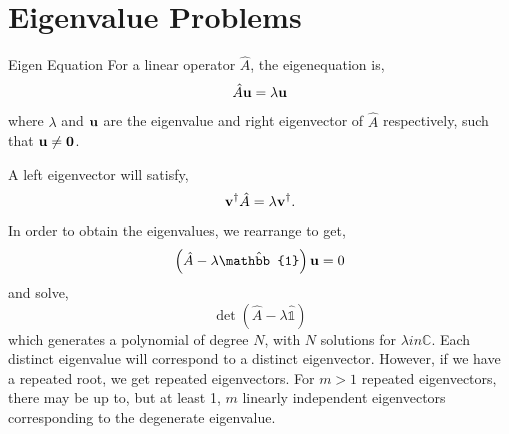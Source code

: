 \documentclass{book}
\begin{document}
\section{Eigenvalue Problems}
\begin{Definitions}{Eigen Equation}{}
	For a linear operator $\hat{A}$, the eigenequation is,
	\begin{equation}
		\hat{A}\vb{u}= \lambda \vb{u}
	\end{equation}
	where $\lambda$ and $\vb{u}$ are the eigenvalue and right eigenvector of $\hat{A}$ respectively, such that $\vb{u} \neq \vb{0}$.
\end{Definitions}
A left eigenvector will satisfy,
\begin{equation}
	\vb{v}^{\dag}\hat{A} = \lambda\vb{v}^{\dag}.
\end{equation}
In order to obtain the eigenvalues, we rearrange to get,
\begin{equation}
	\left(\hat{A} - \lambda \hat{\mathbb{1}}\right)\vb{u} = 0
\end{equation}
and solve,
\begin{equation}
	\det\left(\hat{A} - \lambda \hat{\mathbb{1}}\right)
\end{equation}
which generates a polynomial of degree $N$, with $N$ solutions for $\lambda in \mathbb{C}$. Each distinct eigenvalue will correspond to a distinct eigenvector. However, if we have a repeated root, we get repeated eigenvectors. For $m > 1$ repeated eigenvectors, there may be up to, but at least 1, $m$ linearly independent eigenvectors corresponding to the degenerate eigenvalue. 
\end{document}
